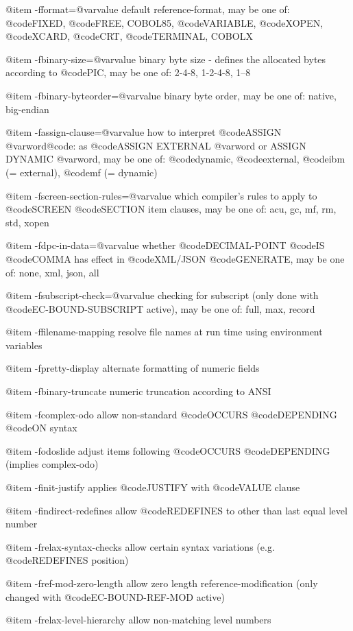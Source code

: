 @item -fformat=@var{value}
default reference-format, may be one of: @code{FIXED}, @code{FREE}, COBOL85, @code{VARIABLE}, @code{XOPEN}, @code{XCARD}, @code{CRT}, @code{TERMINAL}, COBOLX

@item -fbinary-size=@var{value}
binary byte size - defines the allocated bytes according to @code{PIC}, may be one of: 2-4-8, 1-2-4-8, 1--8

@item -fbinary-byteorder=@var{value}
binary byte order, may be one of: native, big-endian

@item -fassign-clause=@var{value}
how to interpret @code{ASSIGN @var{word}@code{: as @code{ASSIGN EXTERNAL @var{word}} or }ASSIGN DYNAMIC @var{word}}, may be one of: @code{dynamic}, @code{external}, @code{ibm} (= external), @code{mf} (= dynamic)

@item -fscreen-section-rules=@var{value}
which compiler's rules to apply to @code{SCREEN} @code{SECTION} item clauses, may be one of: acu, gc, mf, rm, std, xopen

@item -fdpc-in-data=@var{value}
whether @code{DECIMAL-POINT} @code{IS} @code{COMMA} has effect in @code{XML/JSON} @code{GENERATE}, may be one of: none, xml, json, all

@item -fsubscript-check=@var{value}
checking for subscript (only done with @code{EC-BOUND-SUBSCRIPT} active), may be one of: full, max, record

@item -ffilename-mapping
resolve file names at run time using environment variables

@item -fpretty-display
alternate formatting of numeric fields

@item -fbinary-truncate
numeric truncation according to ANSI

@item -fcomplex-odo
allow non-standard @code{OCCURS} @code{DEPENDING} @code{ON} syntax

@item -fodoslide
adjust items following @code{OCCURS} @code{DEPENDING} (implies complex-odo)

@item -finit-justify
applies @code{JUSTIFY} with @code{VALUE} clause

@item -findirect-redefines
allow @code{REDEFINES} to other than last equal level number

@item -frelax-syntax-checks
allow certain syntax variations (e.g. @code{REDEFINES} position)

@item -fref-mod-zero-length
allow zero length reference-modification (only changed with @code{EC-BOUND-REF-MOD} active)

@item -frelax-level-hierarchy
allow non-matching level numbers

